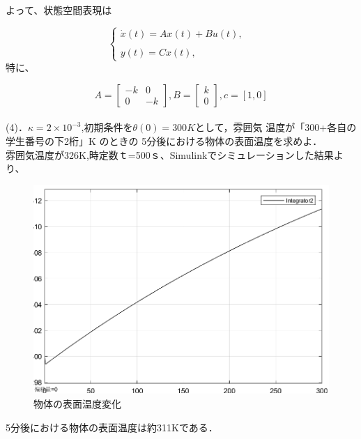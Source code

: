 \documentclass[xelatex,ja=standard,jafont=noto]{bxjsarticle}
\begin{document}
よって、状態空間表現は

\begin{equation}
\left\{
             \begin{array}{lr}
             \dot{x}(t)=Ax(t)+Bu(t), & \\
             &\\
             y(t)=Cx(t), & 
             \end{array}
\right.
\end{equation}
特に、

\begin{equation}
A={
\left[ \begin{array}{cc}
-k&0\\
0&-k
\end{array}
\right ]},B={
\left[ \begin{array}{c}
k\\
0
\end{array}
\right ]},c=[1,0]
\end{equation}\\

(4)．$ \kappa=2\times 10^{-3} $,初期条件を$ \theta(0)=300K $として，雰囲気
温度が「300+各自の学生番号の下2桁」K のときの
5分後における物体の表面温度を求めよ．\\

雰囲気温度が326K,時定数ｔ=500ｓ、Simulinkでシミュレーションした結果より、

\begin{figure}[h!]
    \centering
    \includegraphics[scale=0.4]{01.png}
    \caption{物体の表面温度変化 }
\end{figure}

5分後における物体の表面温度は約311Kである．
\end{document}
